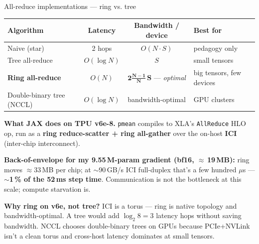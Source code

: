 \documentclass[aspectratio=169,10pt]{beamer}
\begin{document}
\begin{frame}{All-reduce implementations — ring vs. tree}
  \centering\footnotesize
  \begin{tabular}{@{}lccl@{}}\toprule
    Algorithm & Latency & Bandwidth / device & Best for \\ \midrule
    Naive (star)             & 2 hops        & $O(N\!\cdot\!S)$   & pedagogy only \\
    Tree all-reduce          & $O(\log N)$   & $S$                & small tensors \\
    \textbf{Ring all-reduce} & $O(N)$        & $\mathbf{2\tfrac{N-1}{N}\,S}$ — \emph{optimal} & big tensors, few devices \\
    Double-binary tree (NCCL)& $O(\log N)$   & bandwidth-optimal  & GPU clusters \\
    \bottomrule
  \end{tabular}

  \vspace{0.6em}\raggedright\small
  \textbf{What JAX does on TPU v6e-8.} \texttt{pmean} compiles to XLA's
  \texttt{AllReduce} HLO op, run as a \textbf{ring reduce-scatter + ring all-gather}
  over the on-host \textbf{ICI} (inter-chip interconnect).

  \vspace{0.4em}
  \textbf{Back-of-envelope for my 9.55\,M-param gradient (bf16, $\approx$\,19\,MB):}
  ring moves $\approx 33$\,MB per chip; at $\sim$90\,GB/s ICI full-duplex that's
  a few hundred $\mu$s — \textbf{$\sim$1\,\% of the 52\,ms step time}.
  Communication is not the bottleneck at this scale; compute starvation is.

  \vspace{0.4em}
  \textbf{Why ring on v6e, not tree?} ICI is a torus — ring is native topology and
  bandwidth-optimal. A tree would add $\log_2 8 = 3$ latency hops without saving
  bandwidth. NCCL chooses double-binary trees on GPUs because PCIe+NVLink isn't a
  clean torus and cross-host latency dominates at small tensors.
\end{frame}
\end{document}
